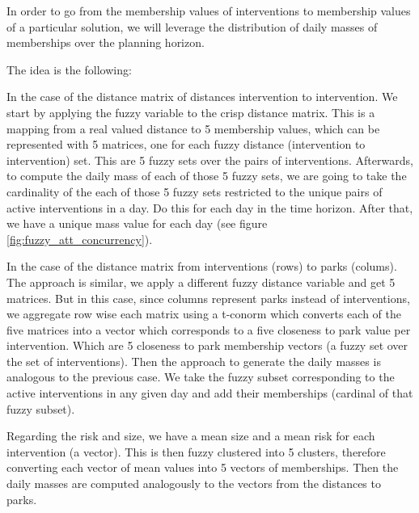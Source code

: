 In order to go from the membership values of interventions to membership values of a particular solution, we will leverage the distribution of daily masses of memberships over the planning horizon.

The idea is the following:

In the case of the distance matrix of distances intervention to intervention. We start by applying the fuzzy variable to the crisp distance matrix. This is a mapping from a real valued distance to 5 membership values, which can be represented with 5 matrices, one for each fuzzy distance (intervention to intervention) set. This are 5 fuzzy sets over the pairs of interventions. Afterwards, to compute the daily mass of each of those 5 fuzzy sets, we are going to take the cardinality of the each of those 5 fuzzy sets restricted to the unique pairs of active interventions in a day. Do this for each day in the time horizon. After that, we have a unique mass value for each day (see figure \ref{fig:fuzzy_att_concurrency}). 

In the case of the distance matrix from interventions (rows) to parks (colums). The approach is similar, we apply a different fuzzy distance variable and get 5 matrices. But in this case, since columns represent parks instead of interventions, we aggregate row wise each matrix using a t-conorm which converts each of the five matrices into a vector which corresponds to a five closeness to park value per intervention. Which are 5 closeness to park membership vectors (a fuzzy set over the set of interventions). Then the approach to generate the daily masses is analogous to the previous case. We take the fuzzy subset corresponding to the active interventions in any given day and add their memberships (cardinal of that fuzzy subset).

Regarding the risk and size, we have a mean size and a mean risk for each intervention (a vector). This is then fuzzy clustered into 5 clusters, therefore converting each vector of mean values into 5 vectors of memberships. Then the daily masses are computed analogously to the vectors from the distances to parks.

 

